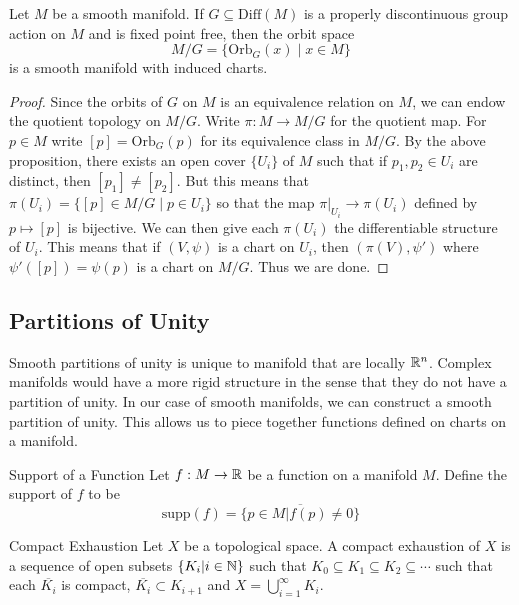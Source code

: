 \documentclass[a4paper]{article}
\begin{document}
\begin{thm}{}{} Let $M$ be a smooth manifold. If $G\subseteq\text{Diff}(M)$ is a properly discontinuous group action on $M$ and is fixed point free, then the orbit space $$M/G=\{\text{Orb}_G(x)\;|\; x\in M\}$$ is a smooth manifold with induced charts. \tcbline
\begin{proof}
Since the orbits of $G$ on $M$ is an equivalence relation on $M$, we can endow the quotient topology on $M/G$. Write $\pi:M\to M/G$ for the quotient map. For $p\in M$ write $[p]=\text{Orb}_G(p)$ for its equivalence class in $M/G$. By the above proposition, there exists an open cover $\{U_i\}$ of $M$ such that if $p_1,p_2\in U_i$ are distinct, then $[p_1]\neq[p_2]$. But this means that $\pi(U_i)=\{[p]\in M/G\;|\;p\in U_i\}$ so that the map $\pi|_{U_i}\to\pi(U_i)$ defined by $p\mapsto[p]$ is bijective. We can then give each $\pi(U_i)$ the differentiable structure of $U_i$. This means that if $(V,\psi)$ is a chart on $U_i$, then $(\pi(V),\psi')$ where $\psi'([p])=\psi(p)$ is a chart on $M/G$. Thus we are done. 
\end{proof}
\end{thm}

\subsection{Partitions of Unity}
Smooth partitions of unity is unique to manifold that are locally $\mathbb{R}^n$. Complex manifolds would have a more rigid structure in the sense that they do not have a partition of unity. In our case of smooth manifolds, we can construct a smooth partition of unity. This allows us to piece together functions defined on charts on a manifold. 

\begin{defn}{Support of a Function}{} Let $f:M\to\mathbb{R}$ be a function on a manifold $M$. Define the support of $f$ to be $$\text{supp}(f)=\overline{\{p\in M|f(p)\neq 0\}}$$
\end{defn}

\begin{defn}{Compact Exhaustion}{} Let $X$ be a topological space. A compact exhaustion of $X$ is a sequence of open subsets $\{K_i|i\in\mathbb{N}\}$ such that $K_0\subseteq K_1\subseteq K_2\subseteq\cdots$ such that each $\overline{K_i}$ is compact, $\overline{K_i}\subset K_{i+1}$ and $X=\bigcup_{i=1}^\infty K_i$. 
\end{defn}
\end{document}
